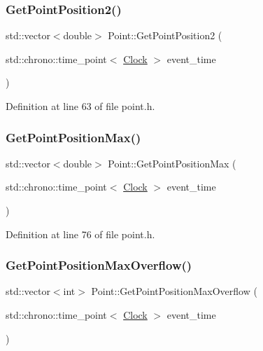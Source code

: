 \subsubsection{\texorpdfstring{Get\+Point\+Position2()}{GetPointPosition2()}}
{\footnotesize\ttfamily std\+::vector$<$double$>$ Point\+::\+Get\+Point\+Position2 (\begin{DoxyParamCaption}\item[{std\+::chrono\+::time\+\_\+point$<$ \mbox{\hyperlink{universe_8h_a0ef8d951d1ca5ab3cfaf7ab4c7a6fd80}{Clock}} $>$}]{event\+\_\+time }\end{DoxyParamCaption})\hspace{0.3cm}{\ttfamily [inline]}}



Definition at line 63 of file point.\+h.

\mbox{\label{class_point_afca47c5ea265894faf7b6aa4f4b17998}} 
\subsubsection{\texorpdfstring{Get\+Point\+Position\+Max()}{GetPointPositionMax()}}
{\footnotesize\ttfamily std\+::vector$<$double$>$ Point\+::\+Get\+Point\+Position\+Max (\begin{DoxyParamCaption}\item[{std\+::chrono\+::time\+\_\+point$<$ \mbox{\hyperlink{universe_8h_a0ef8d951d1ca5ab3cfaf7ab4c7a6fd80}{Clock}} $>$}]{event\+\_\+time }\end{DoxyParamCaption})\hspace{0.3cm}{\ttfamily [inline]}}



Definition at line 76 of file point.\+h.

\mbox{\label{class_point_a228830fddb8b4d90e910e0774796e635}} 
\subsubsection{\texorpdfstring{Get\+Point\+Position\+Max\+Overflow()}{GetPointPositionMaxOverflow()}}
{\footnotesize\ttfamily std\+::vector$<$int$>$ Point\+::\+Get\+Point\+Position\+Max\+Overflow (\begin{DoxyParamCaption}\item[{std\+::chrono\+::time\+\_\+point$<$ \mbox{\hyperlink{universe_8h_a0ef8d951d1ca5ab3cfaf7ab4c7a6fd80}{Clock}} $>$}]{event\+\_\+time }\end{DoxyParamCaption})\hspace{0.3cm}{\ttfamily [inline]}}



